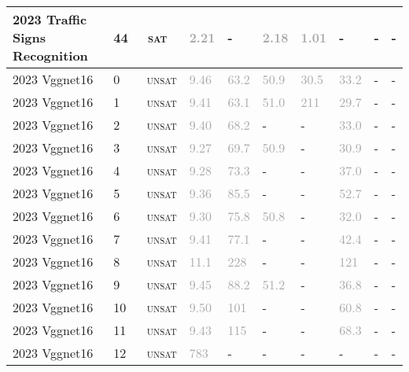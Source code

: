 \begin{center}
{\begin{longtable}{@{}llllllllll@{}}
2023 Traffic Signs Recognition & 44 & ~\textsc{sat} & \textcolor{darkgray}{2.21} & - & \textcolor{darkgray}{2.18} & \textcolor{darkgray}{1.01} & - & - & - \\
\midrule
2023 Vggnet16 & 0 & ~\textsc{unsat} & \textcolor{darkgray}{9.46} & \textcolor{darkgray}{63.2} & \textcolor{darkgray}{50.9} & \textcolor{darkgray}{30.5} & \textcolor{darkgray}{33.2} & - & - \\
2023 Vggnet16 & 1 & ~\textsc{unsat} & \textcolor{darkgray}{9.41} & \textcolor{darkgray}{63.1} & \textcolor{darkgray}{51.0} & \textcolor{darkgray}{211} & \textcolor{darkgray}{29.7} & - & - \\
2023 Vggnet16 & 2 & ~\textsc{unsat} & \textcolor{darkgray}{9.40} & \textcolor{darkgray}{68.2} & - & - & \textcolor{darkgray}{33.0} & - & - \\
2023 Vggnet16 & 3 & ~\textsc{unsat} & \textcolor{darkgray}{9.27} & \textcolor{darkgray}{69.7} & \textcolor{darkgray}{50.9} & - & \textcolor{darkgray}{30.9} & - & - \\
2023 Vggnet16 & 4 & ~\textsc{unsat} & \textcolor{darkgray}{9.28} & \textcolor{darkgray}{73.3} & - & - & \textcolor{darkgray}{37.0} & - & - \\
2023 Vggnet16 & 5 & ~\textsc{unsat} & \textcolor{darkgray}{9.36} & \textcolor{darkgray}{85.5} & - & - & \textcolor{darkgray}{52.7} & - & - \\
2023 Vggnet16 & 6 & ~\textsc{unsat} & \textcolor{darkgray}{9.30} & \textcolor{darkgray}{75.8} & \textcolor{darkgray}{50.8} & - & \textcolor{darkgray}{32.0} & - & - \\
2023 Vggnet16 & 7 & ~\textsc{unsat} & \textcolor{darkgray}{9.41} & \textcolor{darkgray}{77.1} & - & - & \textcolor{darkgray}{42.4} & - & - \\
2023 Vggnet16 & 8 & ~\textsc{unsat} & \textcolor{darkgray}{11.1} & \textcolor{darkgray}{228} & - & - & \textcolor{darkgray}{121} & - & - \\
2023 Vggnet16 & 9 & ~\textsc{unsat} & \textcolor{darkgray}{9.45} & \textcolor{darkgray}{88.2} & \textcolor{darkgray}{51.2} & - & \textcolor{darkgray}{36.8} & - & - \\
2023 Vggnet16 & 10 & ~\textsc{unsat} & \textcolor{darkgray}{9.50} & \textcolor{darkgray}{101} & - & - & \textcolor{darkgray}{60.8} & - & - \\
2023 Vggnet16 & 11 & ~\textsc{unsat} & \textcolor{darkgray}{9.43} & \textcolor{darkgray}{115} & - & - & \textcolor{darkgray}{68.3} & - & - \\
2023 Vggnet16 & 12 & ~\textsc{unsat} & \textcolor{darkgray}{783} & - & - & - & - & - & - \\

\end{longtable}}
\end{center}
